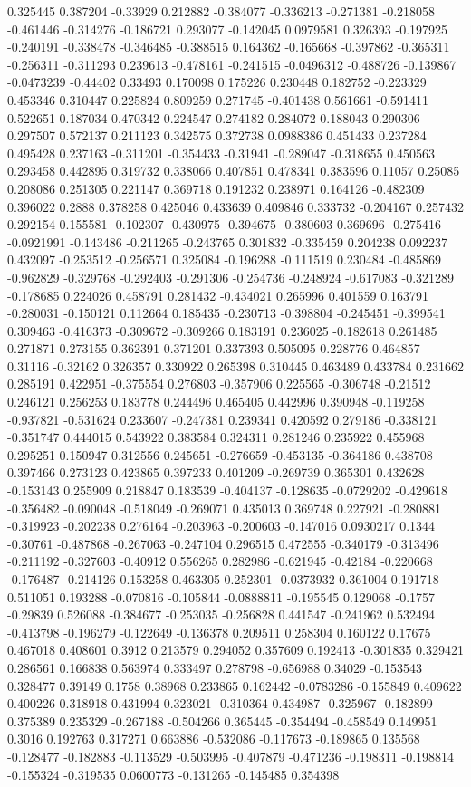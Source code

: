 0.325445 0.387204 -0.33929 0.212882 -0.384077 -0.336213 -0.271381 -0.218058 -0.461446 -0.314276 -0.186721 0.293077 -0.142045 0.0979581 0.326393 -0.197925 -0.240191 -0.338478 -0.346485 -0.388515 0.164362 -0.165668 -0.397862 -0.365311 -0.256311 -0.311293 0.239613 -0.478161 -0.241515 -0.0496312 -0.488726 -0.139867 -0.0473239 -0.44402 0.33493 0.170098 0.175226 0.230448 0.182752 -0.223329 0.453346 0.310447 0.225824 0.809259 0.271745 -0.401438 0.561661 -0.591411 0.522651 0.187034 0.470342 0.224547 0.274182 0.284072 0.188043 0.290306 0.297507 0.572137 0.211123 0.342575 0.372738 0.0988386 0.451433 0.237284 0.495428 0.237163 -0.311201 -0.354433 -0.31941 -0.289047 -0.318655 0.450563 0.293458 0.442895 0.319732 0.338066 0.407851 0.478341 0.383596 0.11057 0.25085 0.208086 0.251305 0.221147 0.369718 0.191232 0.238971 0.164126 -0.482309 0.396022 0.2888 0.378258 0.425046 0.433639 0.409846 0.333732 -0.204167 0.257432 0.292154 0.155581 -0.102307 -0.430975 -0.394675 -0.380603 0.369696 -0.275416 -0.0921991 -0.143486 -0.211265 -0.243765 0.301832 -0.335459 0.204238 0.092237 0.432097 -0.253512 -0.256571 0.325084 -0.196288 -0.111519 0.230484 -0.485869 -0.962829 -0.329768 -0.292403 -0.291306 -0.254736 -0.248924 -0.617083 -0.321289 -0.178685 0.224026 0.458791 0.281432 -0.434021 0.265996 0.401559 0.163791 -0.280031 -0.150121 0.112664 0.185435 -0.230713 -0.398804 -0.245451 -0.399541 0.309463 -0.416373 -0.309672 -0.309266 0.183191 0.236025 -0.182618 0.261485 0.271871 0.273155 0.362391 0.371201 0.337393 0.505095 0.228776 0.464857 0.31116 -0.32162 0.326357 0.330922 0.265398 0.310445 0.463489 0.433784 0.231662 0.285191 0.422951 -0.375554 0.276803 -0.357906 0.225565 -0.306748 -0.21512 0.246121 0.256253 0.183778 0.244496 0.465405 0.442996 0.390948 -0.119258 -0.937821 -0.531624 0.233607 -0.247381 0.239341 0.420592 0.279186 -0.338121 -0.351747 0.444015 0.543922 0.383584 0.324311 0.281246 0.235922 0.455968 0.295251 0.150947 0.312556 0.245651 -0.276659 -0.453135 -0.364186 0.438708 0.397466 0.273123 0.423865 0.397233 0.401209 -0.269739 0.365301 0.432628 -0.153143 0.255909 0.218847 0.183539 -0.404137 -0.128635 -0.0729202 -0.429618 -0.356482 -0.090048 -0.518049 -0.269071 0.435013 0.369748 0.227921 -0.280881 -0.319923 -0.202238 0.276164 -0.203963 -0.200603 -0.147016 0.0930217 0.1344 -0.30761 -0.487868 -0.267063 -0.247104 0.296515 0.472555 -0.340179 -0.313496 -0.211192 -0.327603 -0.40912 0.556265 0.282986 -0.621945 -0.42184 -0.220668 -0.176487 -0.214126 0.153258 0.463305 0.252301 -0.0373932 0.361004 0.191718 0.511051 0.193288 -0.070816 -0.105844 -0.0888811 -0.195545 0.129068 -0.1757 -0.29839 0.526088 -0.384677 -0.253035 -0.256828 0.441547 -0.241962 0.532494 -0.413798 -0.196279 -0.122649 -0.136378 0.209511 0.258304 0.160122 0.17675 0.467018 0.408601 0.3912 0.213579 0.294052 0.357609 0.192413 -0.301835 0.329421 0.286561 0.166838 0.563974 0.333497 0.278798 -0.656988 0.34029 -0.153543 0.328477 0.39149 0.1758 0.38968 0.233865 0.162442 -0.0783286 -0.155849 0.409622 0.400226 0.318918 0.431994 0.323021 -0.310364 0.434987 -0.325967 -0.182899 0.375389 0.235329 -0.267188 -0.504266 0.365445 -0.354494 -0.458549 0.149951 0.3016 0.192763 0.317271 0.663886 -0.532086 -0.117673 -0.189865 0.135568 -0.128477 -0.182883 -0.113529 -0.503995 -0.407879 -0.471236 -0.198311 -0.198814 -0.155324 -0.319535 0.0600773 -0.131265 -0.145485 0.354398 